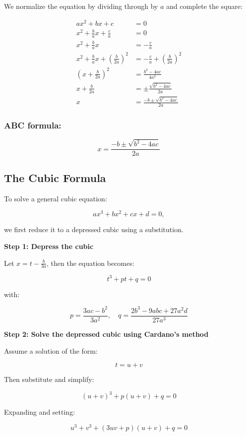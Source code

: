 We normalize the equation by dividing through by \(a\) and complete the square:

\begin{align*}
ax^2 + bx + c &= 0 \\
x^2 + \frac{b}{a}x + \frac{c}{a} &= 0 \\
x^2 + \frac{b}{a}x &= -\frac{c}{a} \\
x^2 + \frac{b}{a}x + {\left(\frac{b}{2a}\right)}^2 &= -\frac{c}{a} + {\left(\frac{b}{2a}\right)}^2 \\
{\left(x + \frac{b}{2a}\right)}^2 &= \frac{b^2 - 4ac}{4a^2} \\
x + \frac{b}{2a} &= \pm \frac{\sqrt{b^2 - 4ac}}{2a} \\
x &= \frac{-b \pm \sqrt{b^2 - 4ac}}{2a}
\end{align*}

\subsubsection{ABC formula:}

\[
x = \frac{-b \pm \sqrt{b^2 - 4ac}}{2a}
\]

\subsection{The Cubic Formula}

To solve a general cubic equation:

\[
ax^3 + bx^2 + cx + d = 0,
\]

we first reduce it to a depressed cubic using a substitution.
\vspace{\baselineskip}

\textbf{Step 1: Depress the cubic}

Let \(x = t - \frac{b}{3a}\), then the equation becomes:

\[
t^3 + pt + q = 0
\]

with:

\[
p = \frac{3ac - b^2}{3a^2}, \quad q = \frac{2b^3 - 9abc + 27a^2d}{27a^3}
\]

\textbf{Step 2: Solve the depressed cubic using Cardano’s method}

Assume a solution of the form:

\[
t = u + v
\]

Then substitute and simplify:

\[
{(u+v)}^3 + p(u+v) + q = 0
\]

Expanding and setting:

\[
u^3 + v^3 + (3uv + p)(u+v) + q = 0
\]

